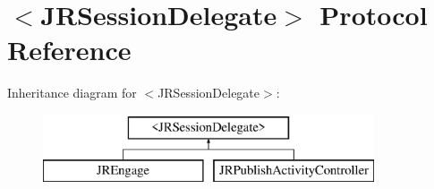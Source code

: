 \hypertarget{protocol_j_r_session_delegate-p}{
\section{$<$JRSessionDelegate$>$ Protocol Reference}
\label{protocol_j_r_session_delegate-p}
}
Inheritance diagram for $<$JRSessionDelegate$>$:\begin{figure}[H]
\begin{center}
\leavevmode
\includegraphics[height=2.000000cm]{protocol_j_r_session_delegate-p}
\end{center}
\end{figure}
